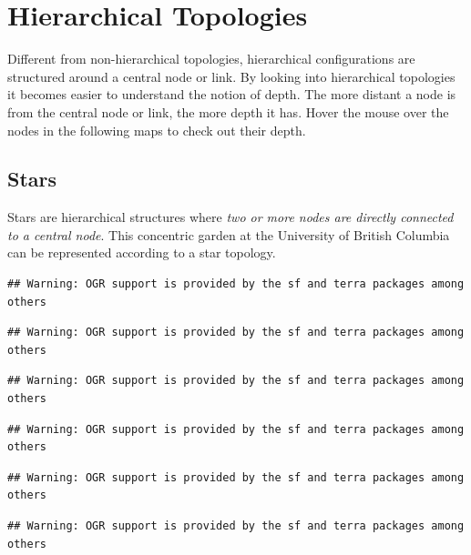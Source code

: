 \documentclass[
]{book}
\begin{document}
\hypertarget{hierarchical-topologies}{%
\section{Hierarchical Topologies}\label{hierarchical-topologies}}

Different from non-hierarchical topologies, hierarchical configurations are structured around a central node or link.
By looking into hierarchical topologies it becomes easier to understand the notion of depth. The more distant a node is from the central node or link, the more depth it has. Hover the mouse over the nodes in the following maps to check out their depth.

\hypertarget{stars}{%
\subsection{Stars}\label{stars}}

Stars are hierarchical structures where \emph{two or more nodes are directly connected to a central node}. This concentric garden at the University of British Columbia can be represented according to a star topology.

\begin{verbatim}
## Warning: OGR support is provided by the sf and terra packages among others
\end{verbatim}

\begin{verbatim}
## Warning: OGR support is provided by the sf and terra packages among others
\end{verbatim}

\begin{verbatim}
## Warning: OGR support is provided by the sf and terra packages among others
\end{verbatim}

\begin{verbatim}
## Warning: OGR support is provided by the sf and terra packages among others
\end{verbatim}

\begin{verbatim}
## Warning: OGR support is provided by the sf and terra packages among others
\end{verbatim}

\begin{verbatim}
## Warning: OGR support is provided by the sf and terra packages among others
\end{verbatim}
\end{document}
